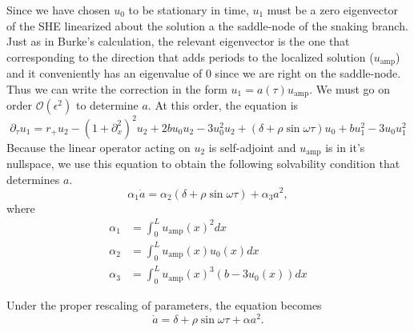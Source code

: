 \documentclass[../main/TimeForcingSHE.tex]{subfiles}
\begin{document}
Since we have chosen $u_0$ to be stationary in time, $u_1$ must be a zero eigenvector of the SHE linearized about the solution a the saddle-node of the snaking branch.  Just as in Burke's calculation, the relevant eigenvector is the one that corresponding to the direction that adds periods to the localized solution ($u_{\text{amp}}$)  and it conveniently has an eigenvalue of 0 since we are right on the saddle-node.  Thus we can write the correction in the form $u_1=a( \tau)u_{\text{amp}}$.
We must go on order  $\mathcal{O}(\epsilon^2)$ to determine $a$.  At this order, the equation is
\begin{equation}
\partial_{\tau} u_1=r_+u_2-\left(1+\partial_{x}^2\right)^2u_2+2b u_0u_2-3u_0^2u_2 +(\delta+\rho \sin\omega \tau )u_0 +bu_1^2- 3u_0 u_1^2 \label{eq:SH}
\end{equation}
Because the linear operator acting on $u_2$ is self-adjoint and $u_{\text{amp}}$ is in it's nullspace, we use this equation to obtain the following solvability condition that determines $a$.  
\begin{equation}
\alpha_1 \dot{a} = \alpha_2 (\delta+\rho\sin\omega  \tau)+\alpha_3 a^2,
\end{equation}
where
\begin{align}
\alpha_1&=\int_0^L u_{\text{amp}}(x)^2 dx\\ \nonumber
\alpha_2&=\int_0^L u_{\text{amp}}(x) u_0(x) dx\\ \nonumber
\alpha_3&=\int_0^L u_{\text{amp}}(x)^3(b- 3u_0(x)) dx
\end{align}

Under the proper rescaling of parameters, the equation becomes
\begin{equation}
 \dot{a} =  \delta+\rho\sin\omega  \tau+\alpha a^2.
\end{equation}
\end{document}
